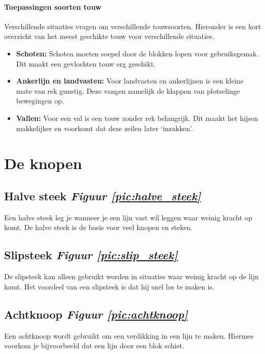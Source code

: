 \paragraph{Toepassingen soorten touw}
Verschillende situaties vragen om verschillende touwsoorten. Hieronder is een kort overzicht van het meest geschikte touw voor verschillende situaties.
\begin{itemize}
	\item \textbf{Schoten:} Schoten moeten soepel door de blokken lopen voor gebruiksgemak. Dit maakt een gevlochten touw erg geschikt.
	\item \textbf{Ankerlijn en landvasten:} Voor landvasten en ankerlijnen is een kleine mate van rek gunstig. Deze vangen namelijk de klappen van plotselinge bewegingen op.
	\item \textbf{Vallen:} Voor een val is een touw zonder rek belangrijk. Dit maakt het hijsen makkelijker en voorkomt dat deze zeilen later `inzakken'.
\end{itemize}


\section{De knopen}
\subsection{Halve steek \hfill \hspace{2 cm} \textit{Figuur \ref{pic:halve_steek}} } 
Een halve steek leg je wanneer je een lijn vast wil leggen waar weinig kracht op komt. De halve steek is de basis voor veel knopen en steken.
\subsection{Slipsteek \hfill \textit{Figuur \ref{pic:slip_steek}}}
De slipsteek kan alleen gebruikt worden in situaties waar weinig kracht op de lijn komt. Het voordeel van een slipsteek is dat hij snel los te maken is.
\subsection{Achtknoop \hfill \textit{Figuur \ref{pic:achtknoop}}}
Een achtknoop wordt gebruikt om een verdikking in een lijn te maken. Hiermee voorkom je bijvoorbeeld dat een lijn door een blok schiet. 

